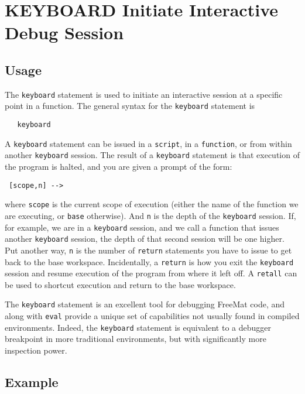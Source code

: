 \section{KEYBOARD Initiate Interactive Debug Session}

\subsection{Usage}

The \verb|keyboard| statement is used to initiate an
interactive session at a specific point in a function.
The general syntax for the \verb|keyboard| statement is
\begin{verbatim}
   keyboard
\end{verbatim}
A \verb|keyboard| statement can be issued in a \verb|script|,
in a \verb|function|, or from within another \verb|keyboard| session.
The result of a \verb|keyboard| statement is that execution
of the program is halted, and you are given a prompt
of the form:
\begin{verbatim}
 [scope,n] -->
\end{verbatim}
where \verb|scope| is the current scope of execution (either
the name of the function we are executing, or \verb|base| otherwise).
And \verb|n| is the depth of the \verb|keyboard| session. If, for example,
we are in a \verb|keyboard| session, and we call a function that issues
another \verb|keyboard| session, the depth of that second session
will be one higher.  Put another way, \verb|n| is the number of \verb|return|
statements you have to issue to get back to the base workspace.
Incidentally, a \verb|return| is how you exit the \verb|keyboard| session
and resume execution of the program from where it left off.  A
\verb|retall| can be used to shortcut execution and return to the base
workspace.

The \verb|keyboard| statement is an excellent tool for debugging
FreeMat code, and along with \verb|eval| provide a unique set of
capabilities not usually found in compiled environments.  Indeed,
the \verb|keyboard| statement is equivalent to a debugger breakpoint in
more traditional environments, but with significantly more inspection
power.
\subsection{Example}

